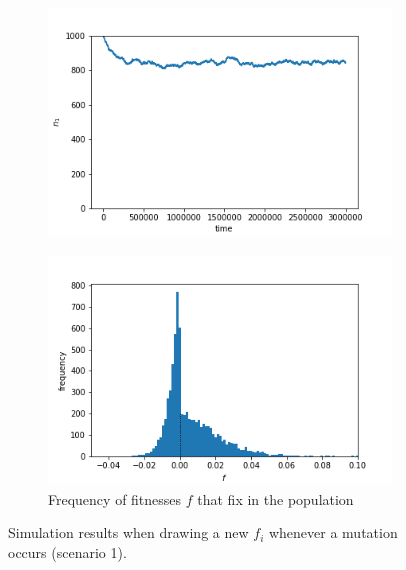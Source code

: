 \documentclass{article}
\begin{document}
\begin{figure}[h]
	\centering
	\begin{subfigure}[t]{0.40\linewidth}
		\centering
		\includegraphics[width = 1.0\linewidth, trim={5 5 40 30}, clip=true]{figures/resample_selection_trajec.png}
		\label{fig:resample_trajec}	
	\end{subfigure}
	\hspace{0.1\linewidth}
	\begin{subfigure}[t]{0.40\linewidth}
		\centering
		\includegraphics[width = 1.0\linewidth, trim={5 5 40 30}, clip=true]{figures/resample_selection_hist2.png}
		\caption{Frequency of fitnesses $f$ that fix in the population}
		\label{fig:resample_hist}
	\end{subfigure}
\caption{Simulation results when drawing a new $f_i$ whenever a mutation occurs (scenario 1).}
\label{fig:resample}
\end{figure}
\end{document}
